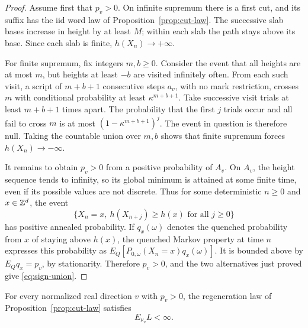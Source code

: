 \begin{proof}
Assume first that \(p_v>0\).  On infinite supremum there is a first
cut, and its suffix has the iid word law of
Proposition~\ref{prop:cut-law}.  The successive slab bases increase in
height by at least \(M\); within each slab the path stays above its
base.  Since each slab is finite, \(h(X_n)\to+\infty\).

For finite supremum, fix integers \(m,b\ge0\).  Consider the event
that all heights are at most \(m\), but heights at least \(-b\) are
visited infinitely often.  From each such visit, a script of
\(m+b+1\) consecutive steps \(a_v\), with no mark restriction,
crosses \(m\) with conditional probability at least
\(\kappa^{m+b+1}\).  Take successive visit trials at least
\(m+b+1\) times apart.  The probability that the first \(j\) trials
occur and all fail to cross \(m\) is at most
\((1-\kappa^{m+b+1})^j\).  The event in question is therefore null.
Taking the countable union over \(m,b\) shows that finite supremum
forces \(h(X_n)\to-\infty\).

It remains to obtain \(p_v>0\) from a positive probability of
\(A_v\).  On \(A_v\), the height sequence tends to infinity, so its
global minimum is attained at some finite time, even if its possible
values are not discrete.  Thus for some deterministic \(n\ge0\)
and \(x\in\mathbb Z^d\), the event
\[
 \{X_n=x,\ h(X_{n+j})\ge h(x)\text{ for all }j\ge0\}
\]
has positive annealed probability.  If \(q_x(\omega)\) denotes the
quenched probability from \(x\) of staying above \(h(x)\), the
quenched Markov property at time \(n\) expresses this probability as
\(E_Q[P_{0,\omega}(X_n=x)q_x(\omega)]\).  It is bounded above by
\(E_Qq_x=p_v\), by stationarity.  Therefore \(p_v>0\), and the
two alternatives just proved give \eqref{eq:sign-union}.
\end{proof}

\begin{proposition}\label{prop:mean-width}
For every normalized real direction \(v\) with \(p_v>0\), the
regeneration law of Proposition~\ref{prop:cut-law} satisfies
\begin{equation}\label{eq:finite-mean-width}
 E_{\nu_v}L<\infty.
\end{equation}
\end{proposition}

